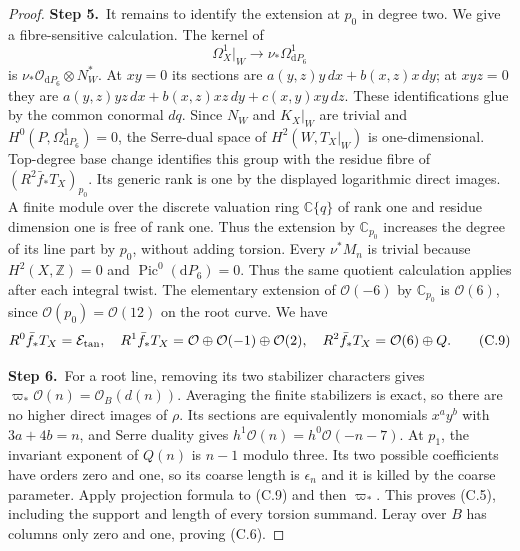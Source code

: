 \begin{proof}
\par\smallskip\noindent\textbf{Step 5.}\ It remains to identify the extension at $p_0$ in degree two. We give
a fibre-sensitive calculation. The kernel of
\[
 \Omega_X^1|_W\longrightarrow\nu_*\Omega_{\mathrm dP_6}^1
\]
is $\nu_*\mathcal O_{\mathrm dP_6}\otimes N_W^*$. At $xy=0$ its sections are
$a(y,z)y\,dx+b(x,z)x\,dy$; at $xyz=0$ they are
$a(y,z)yz\,dx+b(x,z)xz\,dy+c(x,y)xy\,dz$.
These identifications glue by the common conormal $dq$.
Since $N_W$ and $K_X|_W$ are trivial and $H^0(P,\Omega_{\mathrm dP_6}^1)=0$, the
Serre-dual space of $H^2(W,T_X|_W)$ is one-dimensional.
Top-degree base change identifies this group with the residue fibre
of $(R^2\bar f_*T_X)_{p_0}$. Its generic rank is one by the displayed logarithmic direct images.
A finite module over the discrete valuation ring $\mathbb C\{q\}$ of rank
one and residue dimension one is free of rank one. Thus the extension
by $\mathbb C_{p_0}$ increases the degree of its line part by $p_0$, without
adding torsion. 
Every $\nu^*M_n$ is trivial because $H^2(X,\mathbb Z)=0$ and
$\operatorname{Pic}^0(\mathrm dP_6)=0$. Thus the same quotient
calculation applies after each integral twist. The elementary extension
of $\mathcal O(-6)$ by $\mathbb C_{p_0}$ is $\mathcal O(6)$,
since $\mathcal O(p_0)=\mathcal O(12)$ on the root curve.
We have
\[
 R^0\bar f_*T_X=\mathcal E_{\rm tan},\quad
 R^1\bar f_*T_X=\mathcal O\oplus\mathcal O(-1)\oplus\mathcal O(2),\quad
 R^2\bar f_*T_X=\mathcal O(6)\oplus Q.                       \tag{C.9}
\]

\par\smallskip\noindent\textbf{Step 6.}\ For a root line, removing its two stabilizer characters gives
$\varpi_*\mathcal O(n)=\mathcal O_B(d(n))$. Averaging the finite stabilizers is exact, so there are no higher direct images of $\rho$. Its sections are equivalently monomials $x^ay^b$ with $3a+4b=n$, and Serre duality gives $h^1\mathcal O(n)=h^0\mathcal O(-n-7)$. At $p_1$, the invariant exponent of $Q(n)$ is $n-1$ modulo three. Its two possible coefficients have orders zero and one, so its coarse length is $\epsilon_n$ and it is killed by the coarse parameter. Apply projection formula to (C.9) and then $\varpi_*$. This proves (C.5), including the support and length of every torsion summand. Leray over $B$ has columns only zero and one, proving (C.6).


\end{proof}

